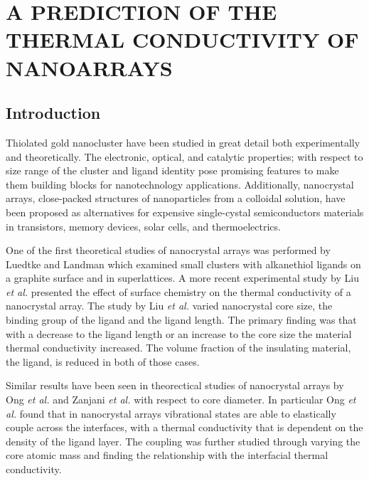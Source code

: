 \chapter{A PREDICTION OF THE THERMAL CONDUCTIVITY OF  NANOARRAYS}\label{chap:arrays}
\section{Introduction}
Thiolated gold nanocluster have been studied in great detail both experimentally and theoretically.\cite{Hakkinen2012, Sardar2009, Jin2010, Tsukuda2012}
The electronic,\cite{Lopez-Acevedo2011,Walter2008} optical,\cite{Cui2014} and catalytic properties;\cite{Chen2013, Lopez-Acevedo2010} with respect to size range of the cluster and ligand identity pose promising features to make them building blocks for nanotechnology applications.\cite{Dong2011,Podsiadlo2010,Shevchenko2006,Talapin2010}
Additionally, nanocrystal arrays, close-packed structures of nanoparticles from a colloidal solution, have been proposed as alternatives for expensive single-cystal semiconductors materials in transistors,\cite{Talapin2005} memory devices,\cite{Sun1999} solar cells,\cite{Tang2011,Gur2005,Ehrler2012} and thermoelectrics.\cite{Ong:2013rt,Kovalenko2010,Wang2008,Ko2011} 

One of the first theoretical studies of nanocrystal arrays was performed by Luedtke and Landman which examined small clusters with alkanethiol ligands on a graphite surface and in superlattices.\cite{Luedtke1996} 
A more recent experimental study by Liu \textit{et al.} presented the effect of surface chemistry on the thermal conductivity of a nanocrystal array.\cite{Liu2015}
The study by Liu \textit{et al.} varied nanocrystal core size, the binding group of the ligand and the ligand length. The primary finding was that with a decrease to the ligand length or an increase to the core size the material thermal conductivity increased. 
The volume fraction of the insulating material, the ligand, is reduced in both of those cases.

Similar results have been seen in theorectical studies of nanocrystal arrays by Ong \textit{et al.}\cite{Ong:2014yq} and Zanjani \textit{et al.}\cite{Zanjani2014} with respect to core diameter.
In particular Ong \textit{et al.} found that in nanocrystal arrays vibrational states are able to elastically couple across the interfaces, with a thermal conductivity that is dependent on the density of the ligand layer.\cite{Ong:2014yq} The coupling was further studied through varying the core atomic mass and finding the relationship with the interfacial thermal conductivity.

